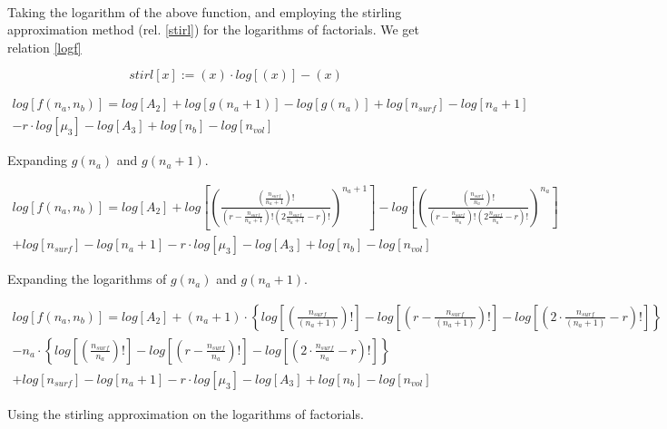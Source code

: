 \documentclass[10pt,letterpaper]{article}
\newcommand{\nads}[1]{
    \ensuremath{
        \frac{
            n_{surf}
        }{
            #1
        }
    }
}
\newcommand{\nlp}[1]{
    \ensuremath{
        r
        -
        \nads{#1}
    }
}
\newcommand{\stirl}[1]{
    \ensuremath{
        \left(
            #1
        \right)
        \cdotp 
        log
        \left[
            \left(
            #1
            \right)
        \right]
        -
        \left(
            #1
        \right)
    }
}
\newcommand{\logOFgOFm}[1]{
	\ensuremath{
	#1
	\cdot
	\left\{
    	log
    	\left[
    	    \left(
    	        \nads{#1}
    	    \right)!
    	\right]
    	-
    	log
    	\left[
        	\left(
        	    \nlp{#1}
        	\right)!
    	\right]
    	-
    	log
    	\left[
    	    \left(
        	    2
        	    \cdot
        	    \nads{#1}
        	    -
        	    r
            \right)!
    	\right]
	\right\}
	}
}
\newcommand{\gOFm}[2]{
\left( \frac{
\left(\frac{#2}{#1}\right)!}{ 
\left(r-\frac{#2}{#1}\right)! 
\left(2\frac{#2}{#1}-r\right)!}
\right)^{#1}  
}
\begin{document}
\text{}\\
\noindent Taking the logarithm of the above function, and employing the stirling approximation method (rel. \ref{stirl}) for the logarithms of factorials. We get relation \ref{logf}

\begin{equation}
	\boxed{stirl[x]:=\stirl{x}}
	\label{stirl}
\end{equation}


\begin{multline}
	log
	\left[
	f(n_a,n_b)
	\right]
	=
	log
		\left[
		A_2
		\right]
		+
		log\left[
            g(n_a+1)
        \right]
        -
        log\left[
            g(n_a)
        \right]
		+
		log
		\left[
		n_{surf}
		\right]
		-
		log
		\left[
		n_a+1
		\right]\\
		-
		r
		\cdot
		log
		\left[
		\mu_{3}
		\right]
		-
		log
		\left[
		A_3
		\right]
		+
		log
		\left[
		n_{b}
		\right]
		-
		log
		\left[
		n_{vol}	
	\right]
		\label{logf}
\end{multline}

\noindent Expanding $g(n_a)$ and $g(n_a +1)$.

\begin{multline}
	log
	\left[
	f(n_a,n_b)
	\right]
	=
	log
		\left[
		A_2
		\right]
		+
		log\left[
            \gOFm{n_a+1}{n_{surf}}
        \right]
        -
        log\left[
            \gOFm{n_a}{n_{surf}}
        \right]\\
		+
		log
		\left[
		n_{surf}
		\right]
		-
		log
		\left[
		n_a+1
		\right]
		-
		r
		\cdot
		log
		\left[
		\mu_{3}
		\right]
		-
		log
		\left[
		A_3
		\right]
		+
		log
		\left[
		n_{b}
		\right]
		-
		log
		\left[
		n_{vol}	
	\right]
		\label{logfexpnd1}
\end{multline}

\noindent Expanding the logarithms of $g(n_a)$ and $g(n_a +1)$.

\begin{multline}
	log
	\left[
	    f(n_a,n_b)
	\right]
	=
	log
	\left[
		A_2
	\right]
	+
	\logOFgOFm{(n_a+1)}\\
    -
    \logOFgOFm{n_a}\\
	+
	log
	\left[
		n_{surf}
	\right]
		-
		log
		\left[
		n_a+1
		\right]
		-
		r
		\cdot
		log
		\left[
		\mu_{3}
		\right]
		-
		log
		\left[
		A_3
		\right]
		+
		log
		\left[
		n_{b}
		\right]
		-
		log
		\left[
		n_{vol}	
	\right]
		\label{logfexpnd1}
\end{multline}

\newpage
\noindent Using the stirling approximation on the logarithms of factorials.
\end{document}
